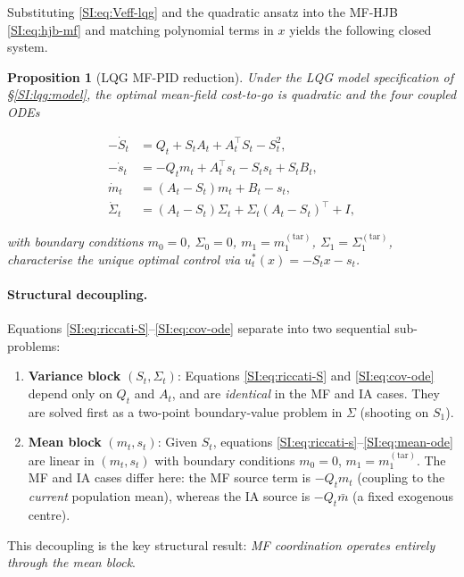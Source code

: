 \documentclass[11pt,onecolumn]{article}
\newtheorem{proposition}[theorem]{Proposition}
\begin{document}
Substituting \eqref{SI:eq:Veff-lqg} and the quadratic ansatz into the
MF-HJB \eqref{SI:eq:hjb-mf} and matching polynomial terms in $x$
yields the following closed system.

\begin{proposition}[LQG MF-PID reduction]
\label{prop:lqg}
Under the LQG model specification of \S\ref{SI:lqg:model}, the
optimal mean-field cost-to-go is quadratic and the four coupled ODEs
\begin{tcolorbox}[colback=gray!8, colframe=gray!40,
  title={\color{black} LQG MF-PID Equations}]
\begin{align}
  -\dot S_t &= Q_t + S_t A_t + A_t^\top S_t - S_t^2,
  \tag{S2.1}\label{SI:eq:riccati-S}\\
  -\dot s_t &= -Q_t m_t + A_t^\top s_t - S_t s_t + S_t B_t,
  \tag{S2.2}\label{SI:eq:riccati-s}\\
  \dot m_t &= (A_t - S_t)m_t + B_t - s_t,
  \tag{S2.3}\label{SI:eq:mean-ode}\\
  \dot\Sigma_t &= (A_t-S_t)\Sigma_t + \Sigma_t(A_t-S_t)^\top + I,
  \tag{S2.4}\label{SI:eq:cov-ode}
\end{align}
\end{tcolorbox}
with boundary conditions
$m_0=0$, $\Sigma_0=0$,
$m_1=m_1^{(\mathrm{tar})}$, $\Sigma_1=\Sigma_1^{(\mathrm{tar})}$,
characterise the unique optimal control via
$u_t^*(x) = -S_t x - s_t$.
\end{proposition}

\paragraph{Structural decoupling.}
Equations \eqref{SI:eq:riccati-S}--\eqref{SI:eq:cov-ode} separate
into two sequential sub-problems:
\begin{enumerate}[1.]
  \item \textbf{Variance block} $(S_t, \Sigma_t)$:
    Equations \eqref{SI:eq:riccati-S} and \eqref{SI:eq:cov-ode} depend
    only on $Q_t$ and $A_t$, and are \emph{identical} in the MF and IA
    cases.
    They are solved first as a two-point boundary-value problem in
    $\Sigma$ (shooting on $S_1$).
  \item \textbf{Mean block} $(m_t, s_t)$:
    Given $S_t$, equations \eqref{SI:eq:riccati-s}--\eqref{SI:eq:mean-ode}
    are linear in $(m_t, s_t)$ with boundary conditions $m_0=0$,
    $m_1=m_1^{(\mathrm{tar})}$.
    The MF and IA cases differ here: the MF source term is $-Q_t m_t$
    (coupling to the \emph{current} population mean), whereas the IA
    source is $-Q_t\bar m$ (a fixed exogenous centre).
\end{enumerate}
This decoupling is the key structural result:
\emph{MF coordination operates entirely through the mean block}.
\end{document}
